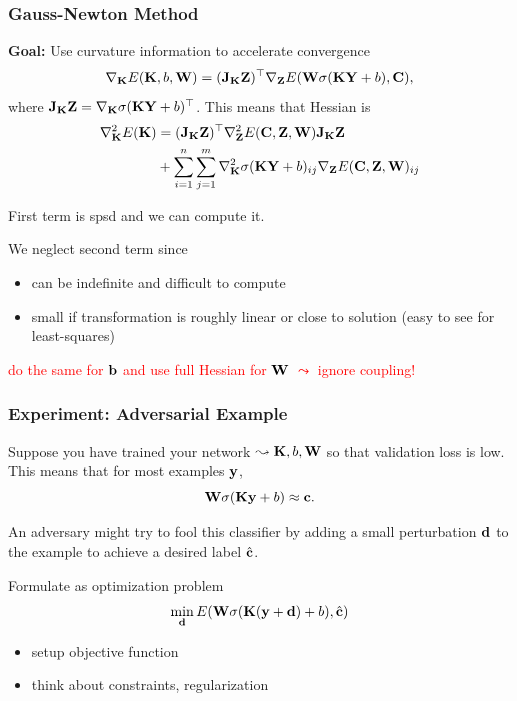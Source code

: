 \documentclass[12pt,fleqn,handout]{beamer}
\begin{document}
\begin{frame}
	\frametitle{Gauss-Newton Method}
	
	\textbf{Goal:} Use curvature information to accelerate convergence
	$$
	\nabla_{{\bf K}} E({\bf K},b,{\bf W}) =  ({\bf J}_{\bf K} {\bf Z})^\top \nabla_{\bf Z} E({\bf W}\sigma({\bf K} {\bf Y}+b),{\bf C}),
	$$
	where ${\bf J}_{\bf K} {\bf Z} = \nabla_{{\bf K}} \sigma({\bf K} {\bf Y}+b)^\top$. This means that Hessian is
	\begin{equation*}
		\begin{split}
	\nabla_{{\bf K}}^2 E({\bf K}) &  = ({\bf J}_{{\bf K}}{\bf Z})^\top  \nabla_{\bf Z}^2 E({\bf C},{\bf Z},{\bf W}) {\bf J}_{{\bf K}}{\bf Z}\\
	 & + \sum_{i=1}^{n}\sum_{j=1}^{m} \nabla_{{\bf K}}^2 \sigma({\bf K} {\bf Y}+b)_{ij} \nabla_{\bf Z} E({\bf C},{\bf Z},{\bf W})_{ij}
		\end{split}
	\end{equation*}
	
	First term is spsd and we can compute it.
	
	We neglect second term since
	\begin{itemize}
		\item can be indefinite and difficult to compute
		\item small if transformation is roughly linear or close to solution (easy to see for least-squares)
	\end{itemize}
	\begin{center}
		\textcolor{red}{do the same for ${\bf b}$ and use full Hessian for ${\bf W}$ $\leadsto$ ignore coupling!}
	\end{center}	
\end{frame}

\begin{frame}[fragile]
	\frametitle{Experiment: Adversarial Example}
	
	Suppose you have trained your network $\leadsto {\bf K}, b, {\bf W}$ so that validation loss is low. This means that for most examples ${\bf y}$, 
	$$
		{\bf W} \sigma({\bf K} {\bf y} + b) \approx {\bf c}.
	$$
	
	An adversary might try to fool this classifier by adding a small perturbation ${\bf d}$ to the example to achieve a desired label $\hat{{\bf c}}$. 
	
	\bigskip
	
	Formulate as optimization problem
	$$
		\min_{{\bf d}} E({\bf W} \sigma({\bf K} ({\bf y} + {\bf d}) + b), \hat{{\bf c}})
	$$
	\begin{itemize}
		\item setup objective function
		\item think about constraints, regularization
	\end{itemize}
\end{frame}
\end{document}

